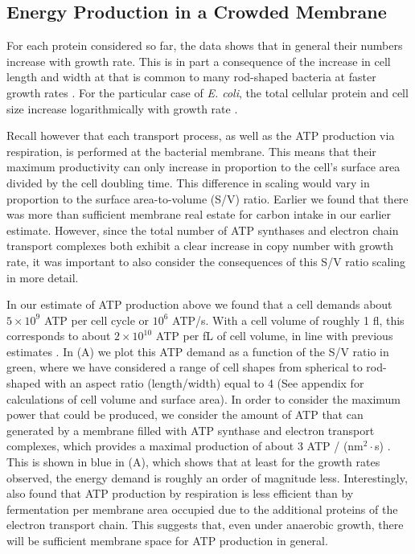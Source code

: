 \subsection{Energy Production in a Crowded Membrane}

For each protein considered so far, the data shows that in general their
numbers increase with growth rate. This is in part a consequence of the
increase in cell length and width at that is common to many rod-shaped
bacteria at faster growth rates \citep{ojkic2019, harris2018}. For the
particular case of \textit{E. coli}, the total cellular protein and cell size
increase logarithmically with growth rate \citep{schaechter1958, si2017}.

Recall however that each transport process, as well as the ATP production via
respiration, is performed at the bacterial membrane. This means that their
maximum productivity can only increase in proportion to the cell's surface
area divided by the cell doubling time. This difference in scaling would vary
in proportion to the surface area-to-volume (S/V) ratio. Earlier we found
that there was more than sufficient membrane real estate for carbon intake in
our earlier estimate. However, since the total number of ATP synthases and
electron chain transport complexes both exhibit a clear increase in copy
number with growth rate, it was important to also consider the consequences
of this S/V ratio scaling in more detail.

In our estimate of ATP production above we found that a cell demands about $5
\times 10^9$ ATP per cell cycle or $10^6$ ATP/s. With a cell volume of
roughly 1 fl, this corresponds to about $2 \times 10^{10}$ ATP per fL of cell
volume, in line with previous estimates \citep{stouthamer1977, szenk2017}. In
 (A) we plot this ATP demand as a function of the S/V
ratio in green, where we have considered a range of cell shapes from
spherical to rod-shaped with an aspect ratio (length/width) equal to 4 (See
appendix for calculations of cell volume and surface area). In order to
consider the maximum power that could be produced, we consider the amount of
ATP that can generated by a membrane filled with ATP synthase and electron
transport complexes, which provides a maximal production of about 3 ATP /
(nm$^2 \cdot$s) \citep{szenk2017}. This is shown in blue in
(A), which shows that at least for the growth rates
observed, the energy demand is roughly an order of magnitude less.
Interestingly, \cite{szenk2017} also found that ATP production by respiration
is less efficient than by fermentation per membrane area occupied due to the
additional proteins of the electron transport chain. This suggests that, even
under anaerobic growth, there will be sufficient membrane space for ATP
production in general.


